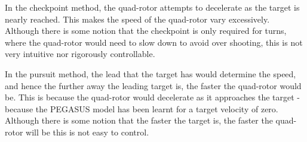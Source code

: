\documentclass[hidelinks,BTech]{iitmdiss}
\newcommand\todo[1]{\textcolor{red}{{\bf TODO}: #1}}
\begin{document}
In the checkpoint method, the quad-rotor attempts to decelerate as the target is nearly reached. This makes the speed of the quad-rotor vary excessively. Although there is some notion that the checkpoint is only required for turns, where the quad-rotor would need to slow down to avoid over shooting, this is not very intuitive nor rigorously controllable.

In the pursuit method, the lead that the target has would determine the speed, and hence the further away the leading target is, the faster the quad-rotor would be. This is because the quad-rotor would decelerate as it approaches the target - because the PEGASUS model has been learnt for a target velocity of zero. Although there is some notion that the faster the target is, the faster the quad-rotor will be this is not easy to control.








\begin{singlespace}
  \pagebreak
  \clearpage
  
\end{singlespace}
\end{document}
